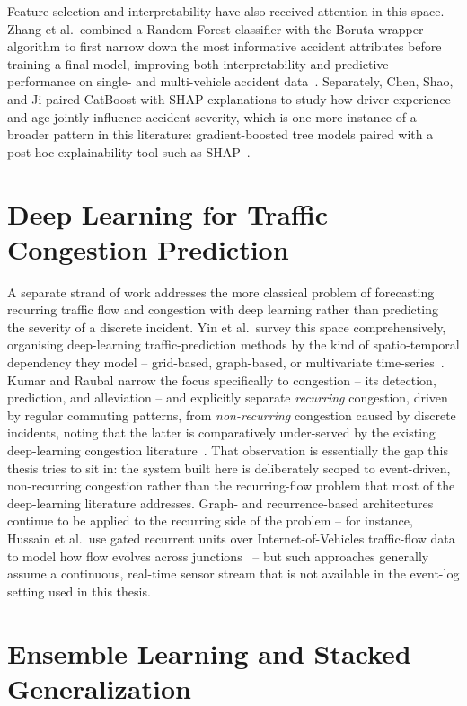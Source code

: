 Feature selection and interpretability have also received attention in this space. Zhang et al.\ combined a Random Forest classifier with the Boruta wrapper algorithm to first narrow down the most informative accident attributes before training a final model, improving both interpretability and predictive performance on single- and multi-vehicle accident data~\cite{zhang2022hybrid}. Separately, Chen, Shao, and Ji paired CatBoost with SHAP explanations to study how driver experience and age jointly influence accident severity, which is one more instance of a broader pattern in this literature: gradient-boosted tree models paired with a post-hoc explainability tool such as SHAP~\cite{chen2021insights}.

\section{Deep Learning for Traffic Congestion Prediction}

A separate strand of work addresses the more classical problem of forecasting recurring traffic flow and congestion with deep learning rather than predicting the severity of a discrete incident. Yin et al.\ survey this space comprehensively, organising deep-learning traffic-prediction methods by the kind of spatio-temporal dependency they model -- grid-based, graph-based, or multivariate time-series~\cite{yin2022deep}. Kumar and Raubal narrow the focus specifically to congestion -- its detection, prediction, and alleviation -- and explicitly separate \emph{recurring} congestion, driven by regular commuting patterns, from \emph{non-recurring} congestion caused by discrete incidents, noting that the latter is comparatively under-served by the existing deep-learning congestion literature~\cite{kumar2021applications}. That observation is essentially the gap this thesis tries to sit in: the system built here is deliberately scoped to event-driven, non-recurring congestion rather than the recurring-flow problem that most of the deep-learning literature addresses. Graph- and recurrence-based architectures continue to be applied to the recurring side of the problem -- for instance, Hussain et al.\ use gated recurrent units over Internet-of-Vehicles traffic-flow data to model how flow evolves across junctions~\cite{hussain2023urban} -- but such approaches generally assume a continuous, real-time sensor stream that is not available in the event-log setting used in this thesis.

\section{Ensemble Learning and Stacked Generalization}

